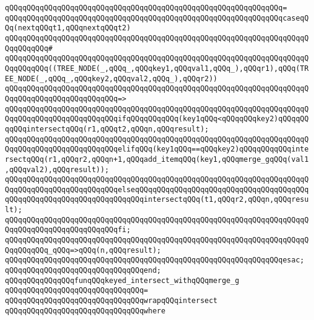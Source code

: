 \verb|qQQqqQQqqQQqqQQqqQQqqQQqqQQqqQQqqQQqqQQqqQQqqQQqqQQqqQQqqQQqqQQq=|\newline
\verb|qQQqqQQqqQQqqQQqqQQqqQQqqQQqqQQqqQQqqQQqqQQqqQQqqQQqqQQqqQQqqQQqcaseqQQq(nextqQQqt1,qQQqnextqQQqt2)|\newline
\verb|qQQqqQQqqQQqqQQqqQQqqQQqqQQqqQQqqQQqqQQqqQQqqQQqqQQqqQQqqQQqqQQqqQQqqQQqqQQqqQQq#|\newline
\verb|qQQqqQQqqQQqqQQqqQQqqQQqqQQqqQQqqQQqqQQqqQQqqQQqqQQqqQQqqQQqqQQqqQQqqQQqqQQqqQQq((TREE_NODE(_,qQQq_,qQQqkey1,qQQqval1,qQQq_),qQQqr1),qQQq(TREE_NODE(_,qQQq_,qQQqkey2,qQQqval2,qQQq_),qQQqr2))|\newline
\verb|qQQqqQQqqQQqqQQqqQQqqQQqqQQqqQQqqQQqqQQqqQQqqQQqqQQqqQQqqQQqqQQqqQQqqQQqqQQqqQQqqQQqqQQqqQQqqQQq=>|\newline
\verb|qQQqqQQqqQQqqQQqqQQqqQQqqQQqqQQqqQQqqQQqqQQqqQQqqQQqqQQqqQQqqQQqqQQqqQQqqQQqqQQqqQQqqQQqqQQqqQQqifqQQqqQQqqQQq(key1qQQq<qQQqqQQqkey2)qQQqqQQqqQQqintersectqQQq(r1,qQQqt2,qQQqn,qQQqresult);|\newline
\verb|qQQqqQQqqQQqqQQqqQQqqQQqqQQqqQQqqQQqqQQqqQQqqQQqqQQqqQQqqQQqqQQqqQQqqQQqqQQqqQQqqQQqqQQqqQQqqQQqelifqQQq(key1qQQq==qQQqkey2)qQQqqQQqqQQqintersectqQQq(r1,qQQqr2,qQQqn+1,qQQqadd_itemqQQq(key1,qQQqmerge_gqQQq(val1,qQQqval2),qQQqresult));|\newline
\verb|qQQqqQQqqQQqqQQqqQQqqQQqqQQqqQQqqQQqqQQqqQQqqQQqqQQqqQQqqQQqqQQqqQQqqQQqqQQqqQQqqQQqqQQqqQQqqQQqelseqQQqqQQqqQQqqQQqqQQqqQQqqQQqqQQqqQQqqQQqqQQqqQQqqQQqqQQqqQQqqQQqqQQqqQQqintersectqQQq(t1,qQQqr2,qQQqn,qQQqresult);|\newline
\verb|qQQqqQQqqQQqqQQqqQQqqQQqqQQqqQQqqQQqqQQqqQQqqQQqqQQqqQQqqQQqqQQqqQQqqQQqqQQqqQQqqQQqqQQqqQQqqQQqfi;|\newline
\newline
\verb|qQQqqQQqqQQqqQQqqQQqqQQqqQQqqQQqqQQqqQQqqQQqqQQqqQQqqQQqqQQqqQQqqQQqqQQqqQQqqQQq_qQQq=>qQQq(n,qQQqresult);|\newline
\verb|qQQqqQQqqQQqqQQqqQQqqQQqqQQqqQQqqQQqqQQqqQQqqQQqqQQqqQQqqQQqqQQqesac;|\newline
\verb|qQQqqQQqqQQqqQQqqQQqqQQqqQQqqQQqend;|\newline
\newline
\verb|qQQqqQQqqQQqqQQqfunqQQqkeyed_intersect_withqQQqmerge_g|\newline
\verb|qQQqqQQqqQQqqQQqqQQqqQQqqQQqqQQq=|\newline
\verb|qQQqqQQqqQQqqQQqqQQqqQQqqQQqqQQqwrapqQQqintersect|\newline
\verb|qQQqqQQqqQQqqQQqqQQqqQQqqQQqqQQqwhere|\newline
